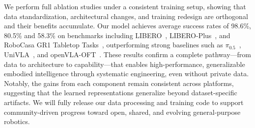 We perform full ablation studies under a consistent training setup, showing that data standardization, architectural changes, and training redesign are orthogonal and their benefits accumulate. Our model achieves average success rates of 98.6\%, 80.5\% and 58.3\% on benchmarks including LIBERO~\cite{liu2023libero}, LIBERO-Plus~\cite{fei25libero-plus}, and RoboCasa GR1 Tabletop Tasks~\cite{GR00T}, outperforming strong baselines such as $\pi_{0.5}$~\cite{pi_0.5}, UniVLA~\cite{bu2025univla}, and openVLA-OFT~\cite{kim2024openvla}. These results confirm a complete pathway---from data to architecture to capability---that enables high-performance, generalizable embodied intelligence through systematic engineering, even without private data. Notably, the gains from each component remain consistent across platforms, suggesting that the learned representations generalize beyond dataset-specific artifacts. We will fully release our data processing and training code to support community-driven progress toward open, shared, and evolving general-purpose robotics.

